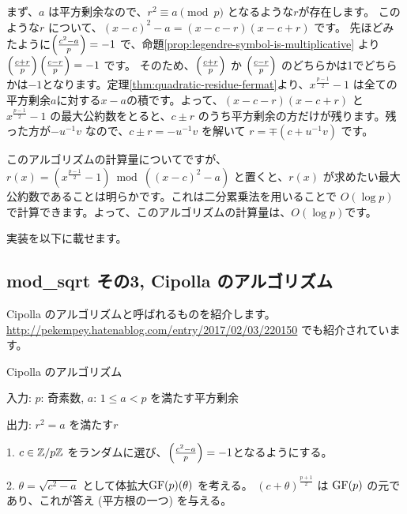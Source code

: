 \documentclass{jsarticle}
\begin{document}
  まず、$a$ は平方剰余なので、$r^2 \equiv a \pmod p$ となるような$r$が存在します。
  このような$r$ について、$(x-c)^2-a = (x - c -r) (x - c + r)$ です。
  先ほどみたように$\left(\frac{c^2-a}{p}\right) = -1$ で、命題\ref{prop:legendre-symbol-is-multiplicative} より$\left(\frac{c + r}{p}\right)\left(\frac{c - r}{p}\right) = -1$ です。
  そのため、$\left(\frac{c + r}{p}\right)$ か $\left(\frac{c - r}{p}\right)$ のどちらかは1でどちらかは$-1$となります。定理\ref{thm:quadratic-residue-fermat}より、$x^{\frac{p-1}{2}}-1$ は全ての平方剰余$a$に対する$x-a$の積です。よって、$(x - c -r) (x - c + r)$ と $x^{\frac{p-1}{2}}-1$ の最大公約数をとると、$c\pm r$ のうち平方剰余の方だけが残ります。残った方が$-u^{-1}v$ なので、$c \pm r = -u^{-1}v$ を解いて $r = \mp (c + u^{-1}v)$ です。

  このアルゴリズムの計算量についてですが、$r(x) = (x^{\frac{p-1}{2}} - 1) \bmod ((x-c)^2 - a)$ と置くと、$r(x)$ が求めたい最大公約数であることは明らかです。これは二分累乗法を用いることで $O(\log p)$ で計算できます。よって、このアルゴリズムの計算量は、$O(\log p)$です。

  実装を以下に載せます。
  
  \subsection{mod\_sqrt その3, Cipolla のアルゴリズム}
  Cipolla のアルゴリズムと呼ばれるものを紹介します。\url{http://pekempey.hatenablog.com/entry/2017/02/03/220150} でも紹介されています。

  \begin{algorithm}
   \caption{Cipolla のアルゴリズム}
   \label{alg:cipolla-mod-sqrt}
   入力: $p$: 奇素数, $a$: $1 \le a < p$ を満たす平方剰余

   出力: $r^2 = a$ を満たす$r$

   1. $c \in \mathbb{Z}/p\mathbb{Z}$ をランダムに選び、$\left(\frac{c^2-a}{p}\right) = -1$となるようにする。

   2. $\theta = \sqrt{c^2-a}$ として体拡大$\mathrm{GF}(p)(\theta)$ を考える。
   $(c + \theta)^{\frac{p+1}{2}}$ は $\mathrm{GF}(p)$ の元であり、これが答え (平方根の一つ) を与える。
  \end{algorithm}
\end{document}
